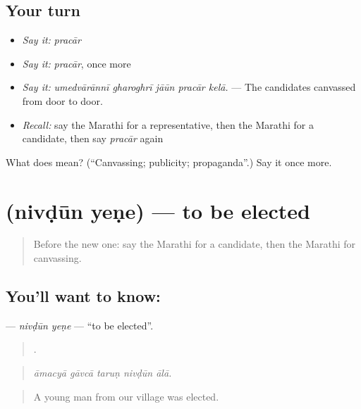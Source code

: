 \subsection*{Your turn}
\begin{itemize}
\raggedright
  \item \emph{Say it:} \emph{pracār}
  \item \emph{Say it:} \emph{pracār}, once more
  \item \emph{Say it:} \emph{umedvārānnī gharoghrī jāūn pracār kelā.} — The candidates canvassed from door to door.
  \item \emph{Recall:} say the Marathi for a representative, then the Marathi for a candidate, then say \emph{pracār} again
\end{itemize}

\begin{tcolorbox}[breakable,colback=teal!4,colframe=teal!35!black,title={Before you move on}]
What does  mean? (\textquotedblleft{}Canvassing; publicity; propaganda\textquotedblright{}.) Say it once more.
\end{tcolorbox}
\section[\texorpdfstring{\mr{निवडून} \mr{येणे} (nivḍūn yeṇe)}{निवडून येणे (nivḍūn yeṇe)}]{  (nivḍūn yeṇe) — to be elected}

\label{lesson:MR-C355-nivdun-yene}



\begin{quote}
Before the new one: say the Marathi for a candidate, then the Marathi for canvassing.
\end{quote}

\subsection*{You'll want to know:  }
\textbf{ } — \emph{nivḍūn yeṇe} — \textquotedblleft{}to be elected\textquotedblright{}.

\begin{quote}
    .
\end{quote}

\begin{quote}
\emph{āmacyā gāvcā taruṇ nivḍūn ālā.}
\end{quote}

\begin{quote}
A young man from our village was elected.
\end{quote}

